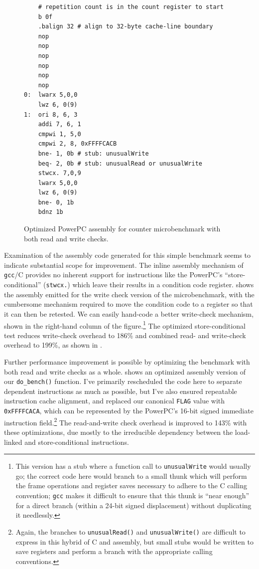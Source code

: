 \begin{figure}
\sis\fontsize{9}{10}\begin{verbatim}
    # repetition count is in the count register to start
    b 0f
    .balign 32 # align to 32-byte cache-line boundary
    nop
    nop
    nop
    nop
    nop
    nop
0:  lwarx 5,0,0
    lwz 6, 0(9)
1:  ori 8, 6, 3
    addi 7, 6, 1
    cmpwi 1, 5,0
    cmpwi 2, 8, 0xFFFFCACB
    bne- 1, 0b # stub: unusualWrite
    beq- 2, 0b # stub: unusualRead or unusualWrite
    stwcx. 7,0,9
    lwarx 5,0,0
    lwz 6, 0(9)
    bne- 0, 1b
    bdnz 1b
\end{verbatim}
\caption{Optimized PowerPC assembly for counter microbenchmark with both read
  and write checks.}
\label{fig:rw-assem}
\end{figure}
Examination of the assembly code generated for this simple benchmark
seems to indicate substantial scope for improvement.  The inline
assembly mechanism of \texttt{gcc}/C provides no inherent support for
instructions 
like the PowerPC's ``store-conditional'' (\texttt{stwcx.}) which leave
their results in a condition code register.  
shows the assembly emitted for the write check version of the
microbenchmark, with the cumbersome mechanism required to move the
condition code to a register so that it can then be retested.  We can
easily hand-code a better write-check mechanism, shown in the
right-hand column of the figure.\footnote{This version has a stub where a
function call to \texttt{unusualWrite} would usually go; the correct
code here would branch to a small thunk which will perform the
frame operations and register saves necessary to adhere to the C
calling convention; \texttt{gcc} makes it difficult to ensure that
this thunk is ``near enough'' for a direct branch (within a 24-bit
signed displacement) without duplicating it needlessly.}
The optimized store-conditional test reduces write-check overhead to
186\% and combined read- and write-check overhead to 199\%, as shown
in .

Further performance improvement is possible by optimizing the
benchmark with both read and write checks as a whole. 
shows an
optimized assembly version of our \texttt{do\_bench()} function.  I've
primarily rescheduled the code here to separate dependent instructions
as much as possible, but I've also ensured repeatable instruction
cache alignment, and replaced our canonical \texttt{FLAG} value with
\texttt{0xFFFFCACA}, which can be represented by the PowerPC's 16-bit
signed immediate instruction field.\footnote{Again, the branches to
\texttt{unusualRead()} and 
\texttt{unusualWrite()} are difficult to express in this hybrid of C
and assembly, but small stubs would be written to save registers and
perform a branch with the appropriate calling conventions.}
The read-and-write check overhead is improved to 143\% with these
optimizations, due mostly to the irreducible dependency between the
load-linked and store-conditional instructions.

